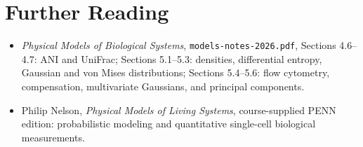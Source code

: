 \section*{Further Reading}
\begin{itemize}
\item \textit{Physical Models of Biological Systems}, \texttt{models-notes-2026.pdf}, Sections 4.6--4.7: ANI and UniFrac; Sections 5.1--5.3: densities, differential entropy, Gaussian and von Mises distributions; Sections 5.4--5.6: flow cytometry, compensation, multivariate Gaussians, and principal components.
\item Philip Nelson, \textit{Physical Models of Living Systems}, course-supplied PENN edition: probabilistic modeling and quantitative single-cell biological measurements.
\end{itemize}
